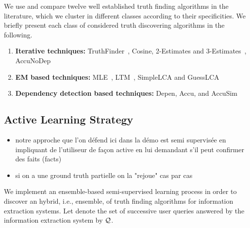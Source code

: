 We use and compare twelve well established truth finding algorithms in the literature,
which we cluster in different classes according to their specificities.
We briefly present each class of considered truth discovering algorithms in the following.

\begin{enumerate}
 \item \textbf{Iterative techniques:} TruthFinder~\cite{YinHY08}, Cosine, 2-Estimates and 3-Estimates~\cite{GallandAMS10}, 
 AccuNoDep~\cite{DongBS09}
 \item \textbf{EM based techniques:} MLE~\cite{WangKLA12}, LTM~\cite{ZhaoRGH12}, SimpleLCA and GuessLCA~\cite{PasternackR13}
 \item \textbf{Dependency detection based techniques:} Depen, Accu, and AccuSim~\cite{DongBS09}
\end{enumerate}



\subsection{Active Learning Strategy}
\begin{itemize}
 \item notre approche que l'on défend ici dans la démo est  semi supervisée en impliquant de l'utiliseur de façon active
en lui demandant s'il peut confirmer des faits (facts)
\item si on a une ground truth partielle on la "rejoue" cas par cas
\end{itemize}

\medskip

We implement an ensemble-based semi-supervised learning process in order to discover an hybrid, i.e., ensemble, of truth
finding algorithms for information extraction systems. Let denote the set of successive user queries answered by the information
extraction system by $\mathcal{Q}$.

